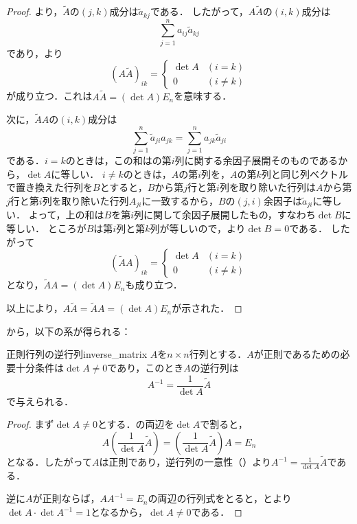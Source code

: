\begin{leftbar}
\begin{proof}
  より，$\tilde{A}$の$(j,k)$成分は$\tilde{a}_{kj}$である．
  したがって，$A\tilde{A}$の$(i,k)$成分は
  \[
    \sum_{j=1}^{n} a_{ij} \tilde{a}_{kj}
  \]
  であり，より
  \[
    (A\tilde{A})_{ik}
    =
    \begin{cases}
      \det A & (i = k) \\
      0 & (i \ne k)
    \end{cases}
  \]
  が成り立つ．これは$A\tilde{A} = (\det A)E_n$を意味する．

  次に，$\tilde{A}A$の$(i,k)$成分は
  \[
    \sum_{j=1}^{n} \tilde{a}_{ji} a_{jk}
    = \sum_{j=1}^{n} a_{jk} \tilde{a}_{ji}
  \]
  である．$i = k$のときは，この和はの第$i$列に関する余因子展開そのものであるから，$\det A$に等しい．
  $i \ne k$のときは，$A$の第$i$列を，$A$の第$k$列と同じ列ベクトルで置き換えた行列を$B$とすると，$B$から第$j$行と第$i$列を取り除いた行列は$A$から第$j$行と第$i$列を取り除いた行列$A_{ji}$に一致するから，$B$の$(j,i)$余因子は$\tilde{a}_{ji}$に等しい．
  よって，上の和は$B$を第$i$列に関して余因子展開したもの，すなわち$\det B$に等しい．
  ところが$B$は第$i$列と第$k$列が等しいので，より$\det B = 0$である．
  したがって
  \[
    (\tilde{A}A)_{ik}
    =
    \begin{cases}
      \det A & (i = k) \\
      0 & (i \ne k)
    \end{cases}
  \]
  となり，$\tilde{A}A = (\det A)E_n$も成り立つ．

  以上により，$A\tilde{A} = \tilde{A}A = (\det A)E_n$が示された．
\end{proof}
\end{leftbar}

から，以下の系が得られる：

\begin{cor}{正則行列の逆行列}{inverse_matrix}
  $A$を$n \times n$行列とする．$A$が正則であるための必要十分条件は$\det A \ne 0$であり，このとき$A$の逆行列は
  \[
  A^{-1} = \frac{1}{\det A} \tilde{A}
  \]
  で与えられる．
\end{cor}

\begin{leftbar}
\begin{proof}
  まず$\det A \ne 0$とする．の両辺を$\det A$で割ると，
  \[
    A \left( \frac{1}{\det A} \tilde{A} \right)
    = \left( \frac{1}{\det A} \tilde{A} \right) A
    = E_n
  \]
  となる．したがって$A$は正則であり，逆行列の一意性（）より$A^{-1} = \frac{1}{\det A} \tilde{A}$である．

  逆に$A$が正則ならば，$AA^{-1} = E_n$の両辺の行列式をとると，とより$\det A \cdot \det A^{-1} = 1$となるから，$\det A \ne 0$である．
\end{proof}
\end{leftbar}



